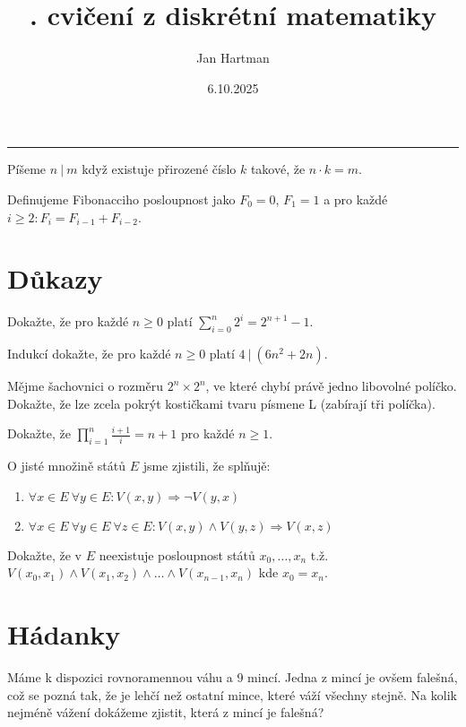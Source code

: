 \documentclass[10pt]{article}
\title{\tutnum. cvičení z diskrétní matematiky}
\author{Jan Hartman}
\date{6.10.2025}
\newcommand{\titlerule}{%
    \noindent %
    \makebox[\textwidth]{\large \thetitle \hfill \thedate}
    \rule{\textwidth}{0.4pt}%
}
\begin{document}
\titlerule

\begin{defn}
    Píšeme $n \ | \ m$ když existuje přirozené číslo $k$ takové, že $n \cdot k = m$.
\end{defn}

\begin{defn}
    Definujeme Fibonacciho posloupnost jako $F_0 = 0$, $F_1 = 1$ a pro každé $i \geq 2 : F_i = F_{i-1} + F_{i-2}$.
\end{defn}

\section{Důkazy}

\begin{problem}
Dokažte, že pro každé $n \geq 0$ platí $\sum_{i=0}^{n}2^i = 2^{n+1} - 1$.
\end{problem}

\begin{problem}[Dělitelnost]
Indukcí dokažte, že pro každé $n \geq 0$ platí $4 \ | \ (6n^2 + 2n)$.
\end{problem}

\begin{problem}[Šachovnice]
Mějme šachovnici o rozměru $2^n \times 2^n$, ve které chybí právě jedno libovolné políčko. Dokažte, že lze zcela pokrýt kostičkami tvaru písmene L (zabírají tři políčka).
\end{problem}

\begin{problem}
Dokažte, že $\prod_{i=1}^{n}\frac{i+1}{i} = n + 1$ pro každé $n \geq 1$.
\end{problem}

\begin{problem}
O jisté množině států $E$ jsme zjistili, že splňujě:
\begin{enumerate}
    \item $\forall x \in E \ \forall y \in E: V(x,y) \Rightarrow \neg V(y,x)$
    \item $\forall x \in E \ \forall y \in E \  \forall z \in E : V(x,y) \wedge V(y,z) \Rightarrow V(x,z)$
\end{enumerate} 
Dokažte, že v $E$ neexistuje posloupnost států $x_0, \ldots , x_n$ t.ž. $V(x_0,x_1) \wedge V(x_1,x_2) \wedge \ldots \wedge  V(x_{n-1},x_n)$ kde $x_0 = x_n$.
\end{problem}

\section{Hádanky}

\begin{problem}
Máme k dispozici rovnoramennou váhu a 9 mincí. Jedna z mincí je ovšem falešná, což se pozná tak, že je lehčí než ostatní mince, které váží všechny stejně. Na kolik nejméně vážení dokážeme zjistit, která z mincí je falešná?
\end{problem}
\end{document}
